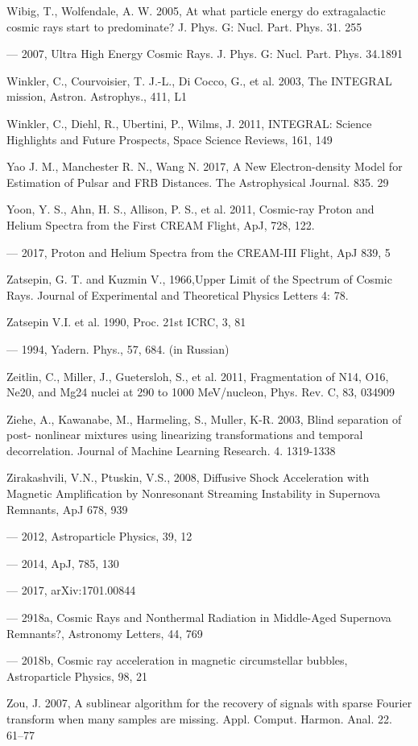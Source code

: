 Wibig, T., Wolfendale, A. W. 2005, At what particle energy do extragalactic cosmic rays start to predominate? J. Phys. G: Nucl. Part. Phys. 31. 255

--- 2007, Ultra High Energy Cosmic Rays. J. Phys. G: Nucl. Part. Phys. 34.1891

Winkler, C., Courvoisier, T. J.-L., Di Cocco, G., et al. 2003, The INTEGRAL mission, Astron. Astrophys., 411, L1

Winkler, C., Diehl, R., Ubertini, P., Wilms, J. 2011, INTEGRAL: Science Highlights and Future Prospects, Space Science Reviews, 161, 149

Yao J. M., Manchester R. N., Wang N. 2017, A New Electron-density Model for Estimation of Pulsar and FRB Distances. The Astrophysical Journal. 835. 29

Yoon, Y. S., Ahn, H. S., Allison, P. S., et al. 2011, Cosmic-ray Proton and Helium Spectra from the First CREAM Flight, ApJ, 728, 122.

--- 2017, Proton and Helium Spectra from the CREAM-III Flight, ApJ 839, 5

Zatsepin, G. T. and Kuzmin V., 1966,Upper Limit of the Spectrum of Cosmic Rays. Journal of Experimental and Theoretical Physics Letters 4: 78.

Zatsepin V.I. et al. 1990, Proc. 21st ICRC, 3, 81

--- 1994, Yadern. Phys., 57, 684. (in Russian)

Zeitlin, C., Miller, J., Guetersloh, S., et al. 2011, Fragmentation of N14, O16, Ne20, and Mg24 nuclei at 290 to 1000 MeV/nucleon, Phys. Rev. C, 83, 034909

Ziehe, A., Kawanabe, M., Harmeling, S., Muller, K-R. 2003, Blind separation of post- nonlinear mixtures using linearizing transformations and temporal decorrelation. Journal of Machine Learning Research. 4. 1319-1338

Zirakashvili, V.N., Ptuskin, V.S., 2008, Diffusive Shock Acceleration with Magnetic Amplification by Nonresonant Streaming Instability in Supernova Remnants, ApJ 678, 939

--- 2012, Astroparticle Physics, 39, 12

--- 2014, ApJ, 785, 130

--- 2017, arXiv:1701.00844

--- 2918a, Cosmic Rays and Nonthermal Radiation in Middle-Aged Supernova Remnants?, Astronomy Letters, 44, 769 

--- 2018b, Cosmic ray acceleration in magnetic circumstellar bubbles, Astroparticle Physics, 98, 21

Zou, J. 2007, A sublinear algorithm for the recovery of signals with sparse Fourier transform when many samples are missing. Appl. Comput. Harmon. Anal. 22. 61--77

